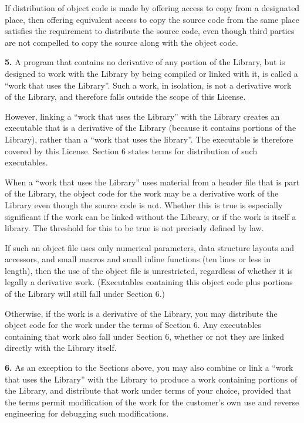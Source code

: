 {{{If distribution of object code is made by offering access to copy from a
designated place, then offering equivalent access to copy the source code from
the same place satisfies the requirement to distribute the source code, even
though third parties are not compelled to copy the source along with the
object code. 

{\bf 5.} A program that contains no derivative of any portion of the Library,
but is designed to work with the Library by being compiled or linked with it,
is called a ``work that uses the Library''. Such a work, in isolation, is not
a derivative work of the Library, and therefore falls outside the scope of
this License. 

However, linking a ``work that uses the Library'' with the Library creates an
executable that is a derivative of the Library (because it contains portions
of the Library), rather than a ``work that uses the library''. The executable
is therefore covered by this License. Section 6 states terms for distribution
of such executables. 

When a ``work that uses the Library'' uses material from a header file that is
part of the Library, the object code for the work may be a derivative work of
the Library even though the source code is not. Whether this is true is
especially significant if the work can be linked without the Library, or if
the work is itself a library. The threshold for this to be true is not
precisely defined by law. 

If such an object file uses only numerical parameters, data structure layouts
and accessors, and small macros and small inline functions (ten lines or less
in length), then the use of the object file is unrestricted, regardless of
whether it is legally a derivative work. (Executables containing this object
code plus portions of the Library will still fall under Section 6.) 

Otherwise, if the work is a derivative of the Library, you may distribute the
object code for the work under the terms of Section 6. Any executables
containing that work also fall under Section 6, whether or not they are linked
directly with the Library itself. 

{\bf 6.} As an exception to the Sections above, you may also combine or link a
``work that uses the Library'' with the Library to produce a work containing
portions of the Library, and distribute that work under terms of your choice,
provided that the terms permit modification of the work for the customer's own
use and reverse engineering for debugging such modifications. 

}}}
